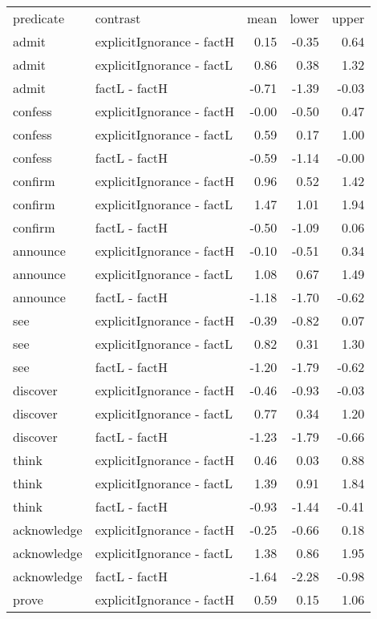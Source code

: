 \begin{longtable}{llrrr}
 predicate & contrast & mean & lower & upper \\ 
 admit & explicitIgnorance - factH & 0.15 & -0.35 & 0.64 \\ 
  admit & explicitIgnorance - factL & 0.86 & 0.38 & 1.32 \\ 
  admit & factL - factH & -0.71 & -1.39 & -0.03 \\ 
  confess & explicitIgnorance - factH & -0.00 & -0.50 & 0.47 \\ 
  confess & explicitIgnorance - factL & 0.59 & 0.17 & 1.00 \\ 
  confess & factL - factH & -0.59 & -1.14 & -0.00 \\ 
  confirm & explicitIgnorance - factH & 0.96 & 0.52 & 1.42 \\ 
  confirm & explicitIgnorance - factL & 1.47 & 1.01 & 1.94 \\ 
  confirm & factL - factH & -0.50 & -1.09 & 0.06 \\ 
  announce & explicitIgnorance - factH & -0.10 & -0.51 & 0.34 \\ 
  announce & explicitIgnorance - factL & 1.08 & 0.67 & 1.49 \\ 
  announce & factL - factH & -1.18 & -1.70 & -0.62 \\ 
  see & explicitIgnorance - factH & -0.39 & -0.82 & 0.07 \\ 
  see & explicitIgnorance - factL & 0.82 & 0.31 & 1.30 \\ 
  see & factL - factH & -1.20 & -1.79 & -0.62 \\ 
  discover & explicitIgnorance - factH & -0.46 & -0.93 & -0.03 \\ 
  discover & explicitIgnorance - factL & 0.77 & 0.34 & 1.20 \\ 
  discover & factL - factH & -1.23 & -1.79 & -0.66 \\ 
  think & explicitIgnorance - factH & 0.46 & 0.03 & 0.88 \\ 
  think & explicitIgnorance - factL & 1.39 & 0.91 & 1.84 \\ 
  think & factL - factH & -0.93 & -1.44 & -0.41 \\ 
  acknowledge & explicitIgnorance - factH & -0.25 & -0.66 & 0.18 \\ 
  acknowledge & explicitIgnorance - factL & 1.38 & 0.86 & 1.95 \\ 
  acknowledge & factL - factH & -1.64 & -2.28 & -0.98 \\ 
  prove & explicitIgnorance - factH & 0.59 & 0.15 & 1.06 \\ 

\end{longtable}
